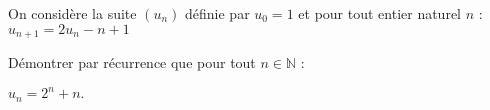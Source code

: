 
On considère la suite $(u_n)$ définie par $u_0=1$ et pour tout entier naturel $n$ : $ u_{n+1}=2u_n-n+1$
\par
Démontrer par récurrence que pour tout $n \in \mathbb{N}$ :  \\ 
\begin{center}
$u_n=2^n+n. $
\end{center}
\par
